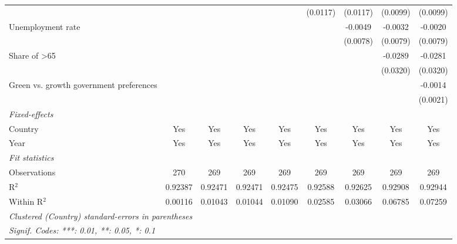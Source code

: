 \begin{table}[htbp]
\begin{tabular}{lcccccccc}
                                                                    &          &          &          &                       & (0.0117) & (0.0117) & (0.0099)              & (0.0099)\\   
      Unemployment rate                                             &          &          &          &                       &          & -0.0049  & -0.0032               & -0.0020\\   
                                                                    &          &          &          &                       &          & (0.0078) & (0.0079)              & (0.0079)\\   
      Share of >65                                                  &          &          &          &                       &          &          & -0.0289               & -0.0281\\   
                                                                    &          &          &          &                       &          &          & (0.0320)              & (0.0320)\\   
      Green vs. growth government preferences                       &          &          &          &                       &          &          &                       & -0.0014\\   
                                                                    &          &          &          &                       &          &          &                       & (0.0021)\\   
      \midrule
      \emph{Fixed-effects}\\
      Country                                                       & Yes      & Yes      & Yes      & Yes                   & Yes      & Yes      & Yes                   & Yes\\  
      Year                                                          & Yes      & Yes      & Yes      & Yes                   & Yes      & Yes      & Yes                   & Yes\\  
      \midrule
      \emph{Fit statistics}\\
      Observations                                                  & 270      & 269      & 269      & 269                   & 269      & 269      & 269                   & 269\\  
      R$^2$                                                         & 0.92387  & 0.92471  & 0.92471  & 0.92475               & 0.92588  & 0.92625  & 0.92908               & 0.92944\\  
      Within R$^2$                                                  & 0.00116  & 0.01043  & 0.01044  & 0.01090               & 0.02585  & 0.03066  & 0.06785               & 0.07259\\  
      \midrule \midrule
      \multicolumn{9}{l}{\emph{Clustered (Country) standard-errors in parentheses}}\\
      \multicolumn{9}{l}{\emph{Signif. Codes: ***: 0.01, **: 0.05, *: 0.1}}\\
   \end{tabular}
\end{table}


